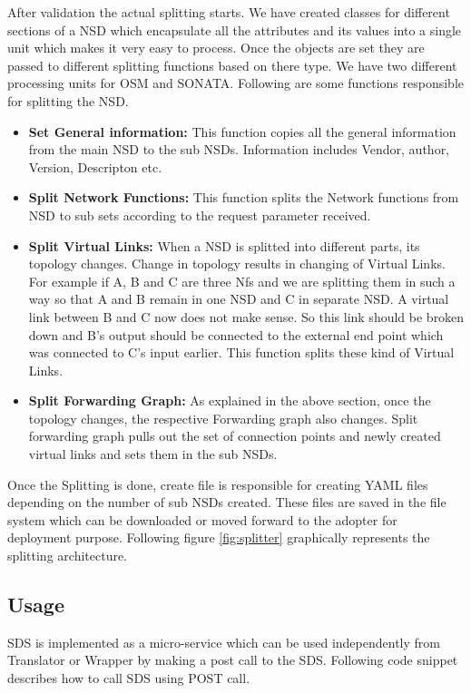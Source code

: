 After validation the actual splitting starts. We have created classes for different sections of a NSD which encapsulate all the attributes and its values into a single unit which makes it very easy to process. Once the objects are set they are passed to different splitting functions based on there type. We have two different processing units for OSM and SONATA. Following are some functions responsible for splitting the NSD.

\begin{itemize}
	\item \textbf{Set General information: }This function copies all the general information from the main NSD to the sub NSDs. Information includes Vendor, author, Version, Descripton etc.
	\item \textbf{Split Network Functions: }This function splits the Network functions from NSD to sub sets according to the request parameter received. 
	\item \textbf{Split Virtual Links: }When a NSD is splitted into different parts, its topology changes. Change in topology results in changing of Virtual Links. For example if A, B and C are three Nfs and we are splitting them in such a way so that A and B remain in one NSD and C in separate NSD. A virtual link between B and C now does not make sense. So this link should be broken down and B’s output should be connected to the external end point which was connected to C’s input earlier. This function splits these kind of Virtual Links.
	\item \textbf{Split Forwarding Graph: }As explained in the above section, once the topology changes, the respective Forwarding graph also changes. Split forwarding graph pulls out the set of connection points and newly created virtual links and sets them in the sub NSDs.
\end{itemize} 

Once the Splitting is done, create file is responsible for creating YAML files depending on the number of sub NSDs created. These files are saved in the file system which can be downloaded or moved forward to the adopter for deployment purpose. Following figure \ref{fig:splitter} graphically represents the splitting architecture.



\subsection{Usage}

SDS is implemented as a micro-service which can be used independently from Translator or Wrapper by making a post call to the SDS. Following code snippet describes how to call SDS using POST call.

